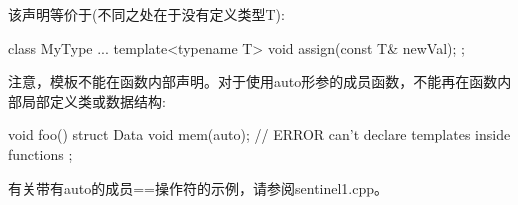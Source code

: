 该声明等价于(不同之处在于没有定义类型T):

\begin{cpp}
class MyType {
	...
	template<typename T>
	void assign(const T& newVal);
};
\end{cpp}

注意，模板不能在函数内部声明。对于使用auto形参的成员函数，不能再在函数内部局部定义类或数据结构:

\begin{cpp}
void foo()
{
	struct Data {
		void mem(auto); // ERROR can’t declare templates inside functions
	};
}
\end{cpp}

有关带有auto的成员==操作符的示例，请参阅sentinel1.cpp。
